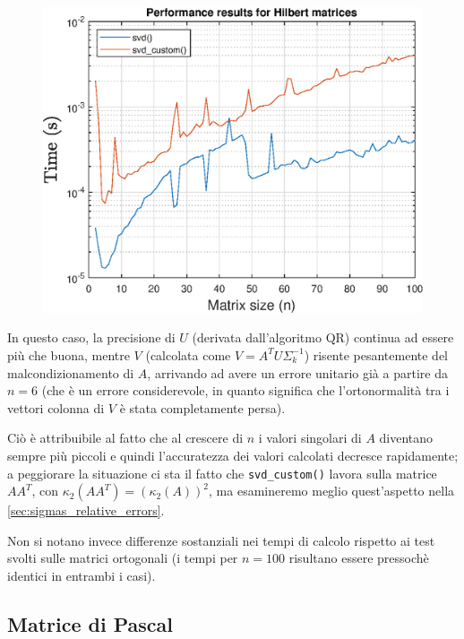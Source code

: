 \begin{figure}[!htb]
\endminipage\hfill
{}  
\includegraphics[width=\linewidth]{imgs/06_-_Performance_results_for_Hilbert_matrices.eps}
\endminipage
\end{figure}

In questo caso, la precisione di $U$ (derivata dall'algoritmo QR) continua ad 
essere più che buona, mentre $V$ (calcolata come $V = A^T U \Sigma_{k}^{-1}$) 
risente pesantemente del malcondizionamento di $A$, arrivando ad avere un errore 
unitario già a partire da $n = 6$ (che è un errore considerevole, in quanto 
significa che l'ortonormalità tra i vettori colonna di $V$ è stata completamente 
persa).

Ciò è attribuibile al fatto che al crescere di $n$ i valori singolari di $A$ 
diventano sempre più piccoli e quindi l'accuratezza dei valori calcolati 
decresce rapidamente; a peggiorare la situazione ci sta il fatto che 
\texttt{svd\_custom()} lavora sulla matrice $A A^T$, con
$\kappa_2(A A^T) = (\kappa_2(A))^2$, ma esamineremo meglio quest'aspetto 
nella \autoref{sec:sigmas_relative_errors}.

Non si notano invece differenze sostanziali nei tempi di calcolo rispetto ai 
test svolti sulle matrici ortogonali (i tempi per $n = 100$ risultano essere 
pressochè identici in entrambi i casi).


\newpage
\subsection{Matrice di Pascal}

